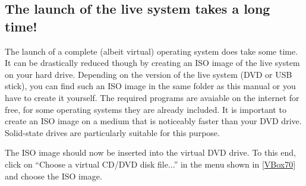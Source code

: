 \documentclass[a4paper,10pt,BCOR=0mm,DIV=14]{scrartcl}
\newcommand{\command}[1]{\textsf{\enquote{#1}}}
\begin{document}
\subsection{The launch of the live system takes a long time!}
The launch of a complete (albeit virtual) operating system does take some time. It can be drastically reduced though by creating an ISO image of the live system on your hard drive. Depending on the version of the live system (DVD or USB stick), you can find such an ISO image in the same folder as this manual or you have to create it yourself. The required programs are avaiable on the internet for free, for some operating systems they are already included. It is important to create an ISO image on a medium that is noticeably faster than your DVD drive. Solid-state drives are particularly suitable for this purpose. 

The ISO image should now be inserted into the virtual DVD drive. To this end, click on \command{Choose a virtual CD/DVD disk file...} in the menu shown in \cref{VBox70} and choose the ISO image. 
\end{document}
